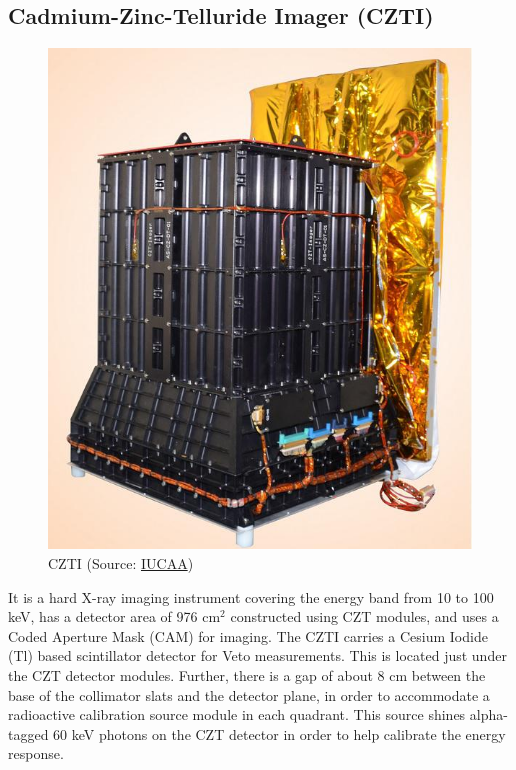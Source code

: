 \documentclass[11pt]{book} %
\begin{document}
\clearpage



\subsection{Cadmium-Zinc-Telluride Imager (CZTI)}


\begin{figure}
    \centering
    \includegraphics[scale=1]{Pictures/czti.jpg}
\caption{CZTI (Source: \href{http://astrosat.iucaa.in/czti/?q=home}{IUCAA})}
\end{figure}

It is a hard X-ray imaging instrument covering the energy band from 10 to 100 keV, has a detector area of 976 cm$^2$ constructed using CZT modules, and uses a Coded Aperture Mask (CAM) for imaging.
The CZTI carries a Cesium Iodide (Tl) based scintillator detector for Veto measurements. This is located just under the CZT detector modules. Further, there is a gap of about 8 cm between the base of the collimator slats and the detector plane, in order to accommodate a radioactive calibration source module in each quadrant. This source shines alpha-tagged 60 keV photons on the CZT detector in order to help calibrate the energy response.
\end{document}
